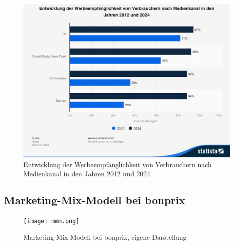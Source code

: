 \begin{figure}[h]
    \centering
    \includegraphics[width=0.75\linewidth]{images/werbeempfaenglichkeit.png}
    \caption{Entwicklung der Werbeempfänglichkeit von Verbrauchern nach Medienkanal in den Jahren 2012 und 2024 \cite{kantar_werbeempfaenglichkeit}}
    \label{fig:enter-label}
\end{figure}
\newpage
\subsection{Marketing-Mix-Modell bei bonprix} 

\begin{figure} [h]
    \centering
    \texttt{[image: mmm.png]}
    \caption{Marketing-Mix-Modell bei bonprix, eigene Darstellung}
    \label{fig:mmmbonprix}
\end{figure}

\newpage
